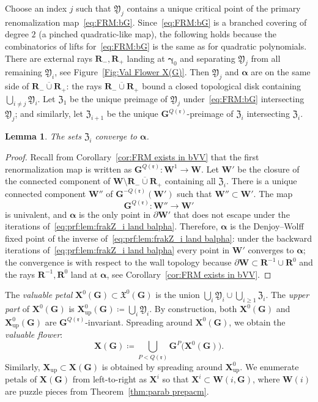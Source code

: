 \documentclass{amsart}
\newcommand{\1}{{\mathbb 1 }}
\newcommand\frakX{{\mathfrak X}}
\newcommand\frakY{{\mathfrak Y}}
\newcommand\frakZ{{\mathfrak Z}}
\newcommand{\bX}{{\mathbf X}}
\newcommand{\bW}{{\mathbf W}}
\newcommand{\bR}{{\mathbf R}}
\newcommand{\bG}{{\mathbf G}}
\newcommand{\rr}{\mathfrak{r}}
\newcommand\up{{\operatorname{up}}}
\newtheorem{lem}[thm]{Lemma}
\theoremstyle{remark}
\numberwithin{equation}{section}
\theoremstyle{definition}
\newcommand{\balpha}{{\boldsymbol \alpha}}
\newcommand{\bgamma}{{\boldsymbol{ \gamma}}}
\theoremstyle{nonumberbreak}
\begin{document}
Choose an index $j$ such that $\frakY_j$ contains a unique critical point of the primary renomalization map~\eqref{eq:FRM:bG}. Since~\eqref{eq:FRM:bG} is a branched covering of degree $2$ (a pinched quadratic-like map), the following holds because the combinatorics of lifts for~\eqref{eq:FRM:bG}  is the same as for quadratic polynomials. There are external rays $\bR_-,\bR_+$ landing at $\bgamma_0$ and separating $\frakY_j$ from all remaining $\frakY_i$, see Figure~\ref{Fig:Val Flower X(G)}. Then $\frakY_j$ and $\balpha$ are on the same side of $\overline{\bR_-\cup\bR_+}$: the rays $\overline{\bR_-\cup\bR_+}$ bound a closed topological disk containing $\displaystyle{\bigcup_{i\not=j} \frakY_i}$. Let $\frakZ_1$ be the unique preimage of $\frakY_j$ under~\eqref{eq:FRM:bG} intersecting $\frakY_j$; and similarly, let $\frakZ_{i+1}$ be the unique $\bG^{Q(\rr)}$-preimage of $\frakZ_i$ intersecting $\frakZ_i$. 


\begin{lem}
\label{lem:frakZ_i land balpha}
The sets $\frakZ_i$ converge to $\balpha$.
\end{lem}
\begin{proof}
Recall from Corollary~\ref{cor:FRM exists in bVV} that the first renormalization map is written as ${\bG^{Q(\rr)}\colon \bW^1\to \bW}$. Let $\bW'$ be the closure of the connected component of ${\bW\setminus \overline {\bR_-\cup \bR_+}}$ containing all $\frakZ_{i}$. There is a unique connected component $\bW''$ of $\bG^{-Q(\rr)}(\bW')$ such that $\bW''\subset \bW'$. The map 
\begin{equation}
\label{eq:prf:lem:frakZ_i land balpha}
\bG^{Q(\rr)}\colon \bW''\to \bW'
\end{equation}
is univalent, and $\balpha$ is the only point in $\partial \bW'$ that does not escape under the iterations of~\eqref{eq:prf:lem:frakZ_i land balpha}. Therefore, $\balpha$ is the Denjoy--Wolff fixed point of the inverse of~\eqref{eq:prf:lem:frakZ_i land balpha}: under the backward iterations of~\eqref{eq:prf:lem:frakZ_i land balpha} every point in $\bW'$ converges to $\balpha$; the convergence is with respect to the wall topology because $\partial \bW\subset \bR^{-1}\cup  \bR^0$ and the rays $\bR^{-1}, \bR^0$ land at $\balpha$, see Corollary~\ref{cor:FRM exists in bVV}.
\end{proof}

The \emph{valuable petal} $\displaystyle{\bX^0(\bG)\subset \frakX^0(\bG)}$ is the union $\displaystyle{\bigcup_i \frakY_i\cup \bigcup_{i\ge 1}\frakZ_i}$. The \emph{upper part} of $\bX^0(\bG)$ is $\displaystyle\bX^0_\up(\bG)\coloneqq \bigcup_i \frakY_i$. By construction, both $\bX^0(\bG)$ and $\bX^0_\up(\bG)$ are $\bG^{Q(\rr)}$-invariant.  Spreading around $\bX^0(\bG)$, we obtain the \emph{valuable flower}: \[\bX(\bG) \coloneqq {\bigcup_{P<Q(\rr)}\bG^P\big(\bX^0(\bG)\big)}.\]
Similarly, $\bX_\up \subset \bX(\bG)$ is obtained by spreading around $\bX_\up^0$. We enumerate petals of $\bX(\bG)$ from left-to-right as $\bX^i$ so that $\bX^i\subset \bW(i,\bG)$, where $\bW(i)$ are puzzle pieces from Theorem~\ref{thm:parab prepacm}.
\end{document}
